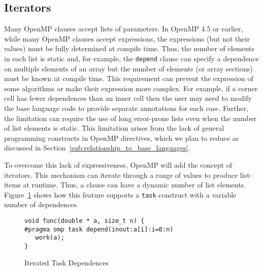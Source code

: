 \subsection{Iterators}
\label{sub:iterators}

Many OpenMP clauses accept lists of parameters. In OpenMP 4.5 or earlier, 
while many OpenMP clauses accept expressions, the expressions (but not 
their values) must be fully determined at compile time. Thus, the number 
of elements in each list is static and, for example, the \texttt{depend} 
clause can specify a dependence on multiple elements of an array but the 
number of elements (or array sections) must be known at compile time. This 
requirement can prevent the expression of some algorithms or make their 
expression more complex. For example, if a corner cell has fewer dependences 
than an inner cell then the user may need to modify the base language code 
to provide separate annotations for each case. Further, the limitation can 
require the use of long error-prone lists even when the number of list 
elements is static. This limitation arises from the lack of general 
programming constructs in OpenMP directives, which we plan to reduce as 
discussed in Section~\ref{sub:relationship_to_base_languages}.

To overcome this lack of expressiveness, OpenMP will add the concept of
iterators. This mechanism can iterate through a range of values to produce 
list-items at runtime. Thus, a clause can have a dynamic number of list 
elements. Figure~\ref{fig:iterators} shows how this feature supports a
\texttt{task} construct with a variable number of dependences.

\begin{figure}
\begin{verbatim}
void func(double * a, size_t n) {
#pragma omp task depend(inout:a[i]:i=0:n)
   work(a);
}
\end{verbatim}
\caption{Iterated Task Dependences\label{fig:iterators}}
\end{figure}


